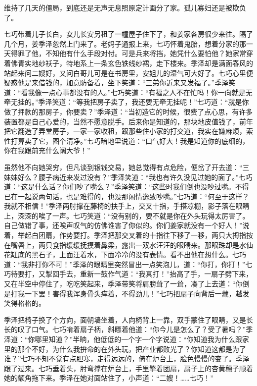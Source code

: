 \par 维持了几天的僵局，到底还是无声无息照原定计画分了家。孤儿寡妇还是被欺负了。
\par 七巧带着儿子长白，女儿长安另租了一幢屋子住下了，和姜家各房很少来往。隔了几个月，姜季泽忽然上门来了。老妈子通报上来，七巧怀着鬼胎，想着分家的那一天得罪了他，不知他有什么手段对付。可是兵来将挡，她凭什么要怕他？她家常穿着佛青实地纱袄子，特地系上一条玄色铁线纱裙，走下楼来。季泽却是满面春风的站起来问二嫂好，又问白哥儿可是在书房里，安姐儿的湿气可大好了。七巧心里便疑惑他是来借钱的，加意防备着，坐下笑道：“三弟你近来又发福了。”季泽笑道：“看我像一点心事都没有的人。”七巧笑道：“有福之人不在忙吗！你一向就是无牵无挂的。”季泽笑道：“等我把房子卖了，我还要无牵无挂呢！”七巧道：“就是你做了押款的那房子，你要卖？”季泽道：“当初造它的时候，很费了点心思，有许多装置都是自己心爱的，当然不愿意脱手。后来你是知道的，那块地皮值钱了，前年把它翻造了弄堂房子，一家一家收租，跟那些住小家的打交道，我实在嫌麻烦，索性打算卖了它，图个清净。”七巧暗地里说道：“口气好大！我是知道你的底细的，你在我跟前充什么阔大爷！”
\par 虽然他不向她哭穷，但凡谈到银钱交易，她总觉得有点危险，便岔了开去道：“三妹妹好么？腰子病近来发过没有？”季泽笑道：“我也有许久没见过她的面了。”七巧道：“这是什么话？你们吵了嘴么？”季泽笑道：“这些时我们倒也没吵过嘴。不得已在一起说两句话，也是难得的，也没那闲情逸致吵嘴。”七巧道：“何至于这样？我就不相信！”季泽两肘撑在藤椅的扶手上，交叉十指，手搭凉棚，影子落在眼睛上，深深的唉了一声。七巧笑道：“没有别的，要不就是你在外头玩得太厉害了。自己做错了事，还唉声叹气的仿佛谁害了你似的。你们姜家就没有一个好人！”说着，举起白团扇，作势要打。季泽把那交叉着的十指往下移了一移，两只大拇指按在嘴唇上，两只食指缓缓抚摸着鼻梁，露出一双水汪汪的眼睛来。那眼珠却是水仙花缸底的黑石子，上面汪着水，下面冷冷的没有表情。看不出他在想什么。七巧道：“我非打你不可！”季泽的眼睛里突然冒出一点笑泡儿，道：“你打，你打！”七巧待要打，又掣回手去，重新一鼓作气道：“我真打！”抬高了手，一扇子劈下来，又在半空中停住了，吃吃笑起来，季泽带笑将肩膀耸了一耸，凑了上去道：“你倒是打我一下罢！害得我浑身骨头痒着，不得劲儿！”七巧把扇子向背后一藏，越发笑得格格的。
\par 季泽把椅子换了个方向，面朝墙坐着，人向椅背上一靠，双手蒙住了眼睛，又是长长的叹了口气。七巧啃着扇子柄，斜瞟着他道：“你今儿是怎么了？受了暑吗？”季泽道：“你哪里知道？”半晌，他低低的一个字一个字说道：“你知道我为什么跟家里的那个不好，为什么我拚命的在外头玩，把产业都败光了？你知道这都是为了谁？”七巧不知不觉有点胆寒，走得远远的，倚在炉台上，脸色慢慢的变了。季泽跟了过来。七巧垂着头，肘弯撑在炉台上，手里擎着团扇，扇子上的杏黄穗子顺着她的额角拖下来。季泽在她对面站住了，小声道：“二嫂！……七巧！”
